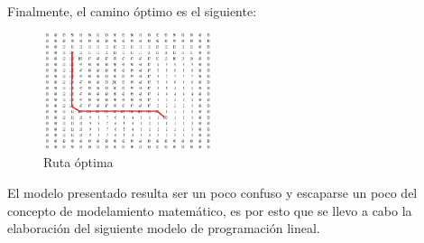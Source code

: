 \documentclass[journal, 10pt]{IEEEtran}
\begin{document}
Finalmente, el camino óptimo es el siguiente:
\begin{figure}[H]
    \centering
    \includegraphics[width=5cm]{4.png}
    \caption{Ruta óptima}
    \label{sol1}
\end{figure}
El modelo presentado resulta ser un poco confuso y escaparse un poco del concepto de modelamiento matemático, es por esto que se llevo a cabo la elaboración del siguiente modelo de programación lineal.\\
\end{document}
